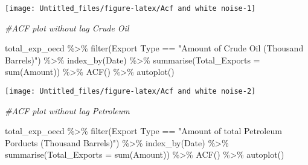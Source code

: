 \documentclass[
]{article}
\newenvironment{Shaded}{\begin{snugshade}}{\end{snugshade}}
\newcommand{\AttributeTok}[1]{\textcolor[rgb]{0.77,0.63,0.00}{#1}}
\newcommand{\CommentTok}[1]{\textcolor[rgb]{0.56,0.35,0.01}{\textit{#1}}}
\newcommand{\FunctionTok}[1]{\textcolor[rgb]{0.00,0.00,0.00}{#1}}
\newcommand{\NormalTok}[1]{#1}
\newcommand{\SpecialCharTok}[1]{\textcolor[rgb]{0.00,0.00,0.00}{#1}}
\newcommand{\StringTok}[1]{\textcolor[rgb]{0.31,0.60,0.02}{#1}}
\begin{document}
\begin{center}\texttt{[image: Untitled\_files/figure-latex/Acf and white noise-1]} \end{center}

\begin{Shaded}
\begin{Highlighting}[]
\CommentTok{\#ACF plot without lag Crude Oil}

\NormalTok{total\_exp\_oecd }\SpecialCharTok{\%\textgreater{}\%} \FunctionTok{filter}\NormalTok{(}\StringTok{\textasciigrave{}}\AttributeTok{Export Type}\StringTok{\textasciigrave{}} \SpecialCharTok{==} \StringTok{"Amount of Crude Oil (Thousand Barrels)"}\NormalTok{) }\SpecialCharTok{\%\textgreater{}\%} 
  \FunctionTok{index\_by}\NormalTok{(Date) }\SpecialCharTok{\%\textgreater{}\%} 
  \FunctionTok{summarise}\NormalTok{(}\AttributeTok{Total\_Exports =} \FunctionTok{sum}\NormalTok{(}\StringTok{\textasciigrave{}}\AttributeTok{Amount}\StringTok{\textasciigrave{}}\NormalTok{)) }\SpecialCharTok{\%\textgreater{}\%} 
  \FunctionTok{ACF}\NormalTok{() }\SpecialCharTok{\%\textgreater{}\%}  \FunctionTok{autoplot}\NormalTok{()}
\end{Highlighting}
\end{Shaded}

\begin{center}\texttt{[image: Untitled\_files/figure-latex/Acf and white noise-2]} \end{center}

\begin{Shaded}
\begin{Highlighting}[]
\CommentTok{\#ACF plot without lag Petroleum}

\NormalTok{total\_exp\_oecd }\SpecialCharTok{\%\textgreater{}\%} \FunctionTok{filter}\NormalTok{(}\StringTok{\textasciigrave{}}\AttributeTok{Export Type}\StringTok{\textasciigrave{}} \SpecialCharTok{==} \StringTok{"Amount of total Petroleum Porducts (Thousand Barrels)"}\NormalTok{) }\SpecialCharTok{\%\textgreater{}\%} 
  \FunctionTok{index\_by}\NormalTok{(Date) }\SpecialCharTok{\%\textgreater{}\%} 
  \FunctionTok{summarise}\NormalTok{(}\AttributeTok{Total\_Exports =} \FunctionTok{sum}\NormalTok{(}\StringTok{\textasciigrave{}}\AttributeTok{Amount}\StringTok{\textasciigrave{}}\NormalTok{)) }\SpecialCharTok{\%\textgreater{}\%} 
  \FunctionTok{ACF}\NormalTok{() }\SpecialCharTok{\%\textgreater{}\%}  \FunctionTok{autoplot}\NormalTok{()}
\end{Highlighting}
\end{Shaded}
\end{document}
